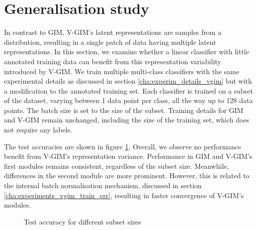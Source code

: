 	\section{Generalisation study} \label{cha:generalisation_study}
		In contrast to GIM, V-GIM's latent representations are samples from a distribution, resulting in a single patch of data having multiple latent representations. In this section, we examine whether a linear classifier with little annotated training data can benefit from this representation variability introduced by V-GIM. We train multiple multi-class classifiers with the same experimental details as discussed in section \ref{cha:experim_details_vgim} but with a modification to the annotated training set. Each classifier is trained on a subset of the dataset, varying between 1 data point per class, all the way up to 128 data points. The batch size is set to the size of the subset. Training details for GIM and V-GIM remain unchanged, including the size of the training set, which does not require any labels.
		
		The test accuracies are shown in figure \ref{fig:subsets_experiment}. Overall, we observe no performance benefit from V-GIM's representation variance. Performance in GIM and V-GIM's first modules remains consistent, regardless of the subset size. Meanwhile, differences in the second module are more prominent. However, this is related to the internal batch normalisation mechanism, discussed in section \ref{cha:experiments_vgim_train_err}, resulting in faster convergence of V-GIM's modules.
		
		\begin{figure}[h] %
			\centering
			\begin{subfigure}[b]{0.4\textwidth}
				\centering
				
			\end{subfigure}
			\hfill
			\begin{subfigure}[b]{0.4\textwidth}
				\centering
				
			\end{subfigure}
			\caption{Test accuracy for different subset sizes}
			\label{fig:subsets_experiment}
		\end{figure}






	



